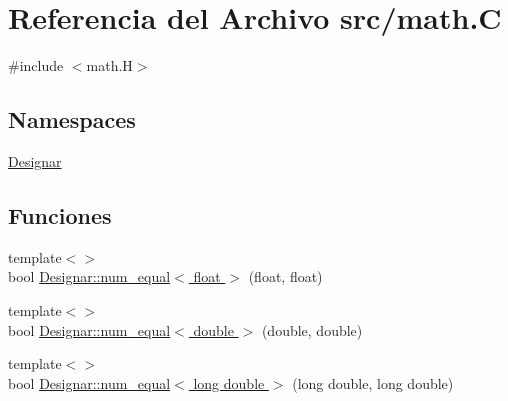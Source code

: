 \hypertarget{math_8_c}{}\section{Referencia del Archivo src/math.C}
\label{math_8_c}
{\ttfamily \#include $<$math.\+H$>$}\newline
\subsection*{Namespaces}
\begin{DoxyCompactItemize}
\item 
 \hyperlink{namespace_designar}{Designar}
\end{DoxyCompactItemize}
\subsection*{Funciones}
\begin{DoxyCompactItemize}
\item 
{\footnotesize template$<$$>$ }\\bool \hyperlink{namespace_designar_a29878d27cf434c0bac7093ec7b4d8613}{Designar\+::num\+\_\+equal$<$ float $>$} (float, float)
\item 
{\footnotesize template$<$$>$ }\\bool \hyperlink{namespace_designar_abc6408777e04d2c538830bf826901317}{Designar\+::num\+\_\+equal$<$ double $>$} (double, double)
\item 
{\footnotesize template$<$$>$ }\\bool \hyperlink{namespace_designar_a161c5a6c7e958d708e5898265c9a37f7}{Designar\+::num\+\_\+equal$<$ long double $>$} (long double, long double)
\end{DoxyCompactItemize}
